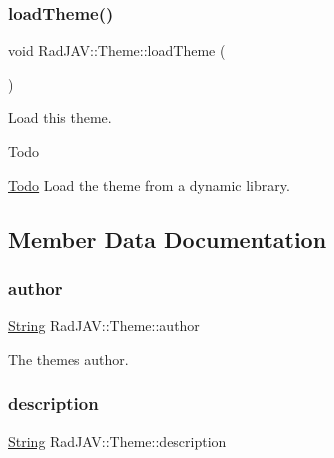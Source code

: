 \subsubsection{\texorpdfstring{load\+Theme()}{loadTheme()}}
{\footnotesize\ttfamily void Rad\+J\+A\+V\+::\+Theme\+::load\+Theme (\begin{DoxyParamCaption}{ }\end{DoxyParamCaption})\hspace{0.3cm}{\ttfamily [protected]}}



Load this theme. 

\begin{DoxyRefDesc}{Todo}
\item[\mbox{\hyperlink{todo__todo000001}{Todo}}]Load the theme from a dynamic library. \end{DoxyRefDesc}


\subsection{Member Data Documentation}
\mbox{\label{class_rad_j_a_v_1_1_theme_adc47f93cb07dbc0ccbd65ad10b85872a}} 
\subsubsection{\texorpdfstring{author}{author}}
{\footnotesize\ttfamily \mbox{\hyperlink{class_rad_j_a_v_1_1_string}{String}} Rad\+J\+A\+V\+::\+Theme\+::author\hspace{0.3cm}{\ttfamily [protected]}}



The theme\textquotesingle{}s author. 

\mbox{\label{class_rad_j_a_v_1_1_theme_a87b0854f11d9f9ab8e2743933ff1d861}} 
\subsubsection{\texorpdfstring{description}{description}}
{\footnotesize\ttfamily \mbox{\hyperlink{class_rad_j_a_v_1_1_string}{String}} Rad\+J\+A\+V\+::\+Theme\+::description\hspace{0.3cm}{\ttfamily [protected]}}



